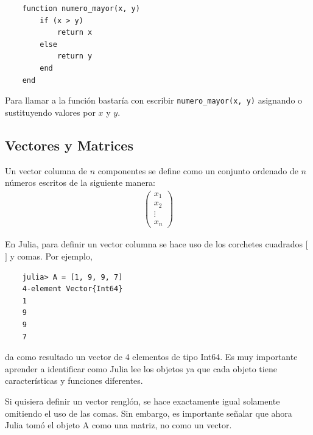 \begin{verbatim}
	function numero_mayor(x, y)
		if (x > y)
			return x
		else
			return y
		end
	end
\end{verbatim}


Para llamar a la función bastaría con escribir \texttt{numero\_mayor(x, y)} asignando o sustituyendo valores por $x$ y $y$. 

\subsection{Vectores y Matrices}

\begin{definition}
Un vector columna de $n$ componentes se define como un conjunto ordenado de $n$ números escritos de la siguiente manera:
\begin{equation*}
    \begin{aligned}
    \begin{pmatrix}
    x_1 \\ 
    x_2 \\
    \vdots \\
    x_n
    \end{pmatrix} 
    \end{aligned}
\end{equation*}
\end{definition}


En Julia, para definir un vector columna se hace uso de los corchetes cuadrados $[$ $]$ y comas. Por ejemplo, 

\begin{verbatim}
	julia> A = [1, 9, 9, 7]
	4-element Vector{Int64}
	1
	9
	9
	7
\end{verbatim}

da como resultado un vector de 4 elementos de tipo Int64. Es muy importante aprender a identificar como Julia lee los objetos ya que cada objeto tiene características y funciones diferentes.  

Si quisiera definir un vector renglón, se hace exactamente igual solamente omitiendo el uso de las comas. Sin embargo, es importante señalar que  ahora Julia tomó el objeto A como una matriz, no como un vector. 

